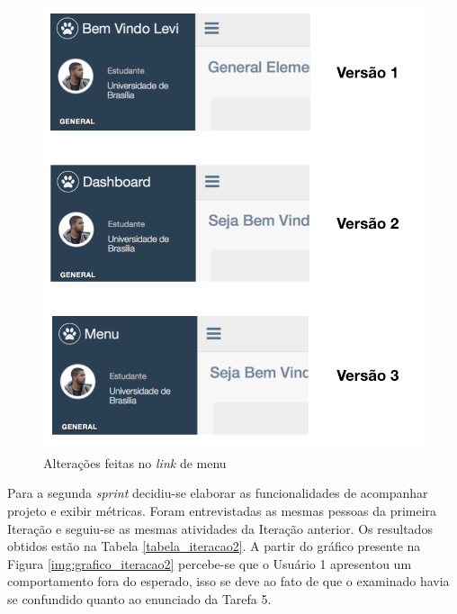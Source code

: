 \graphicspath{{figuras/}}
\begin{figure}[h!]
\centering
\includegraphics[scale=0.80]{comparacao_versoes_menu}
\caption{Alterações feitas no \textit{link} de menu}
\label{img:alteracao_menu}
\end{figure}

Para a segunda \textit{sprint} decidiu-se elaborar as funcionalidades de acompanhar projeto e exibir métricas. Foram entrevistadas as mesmas pessoas da primeira Iteração e seguiu-se as mesmas atividades da Iteração anterior. Os resultados obtidos estão na Tabela \ref{tabela_iteracao2}. A partir do gráfico presente na Figura \ref{img:grafico_iteracao2} percebe-se que o Usuário 1 apresentou um comportamento fora do esperado, isso se deve ao fato de que o examinado havia se confundido quanto ao enunciado da Tarefa 5.


